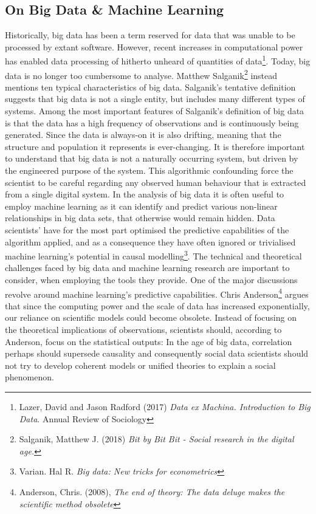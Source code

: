 \documentclass[12pt,a4paper]{article}
\begin{document}
\subsection{On Big Data \& Machine Learning}
Historically, big data has been a term reserved for data that was unable to be processed by extant software. However, recent increases in computational power has enabled data processing of hitherto unheard of quantities of data\footnote{Lazer, David and Jason Radford (2017) \textit{Data ex Machina. Introduction to Big Data}. Annual Review of Sociology}. Today, big data is no longer too cumbersome to analyse. Matthew Salganik\footnote{Salganik, Matthew J. (2018) \textit{Bit by Bit Bit - Social research in the digital age.}} instead mentions ten typical characteristics of big data. Salganik's tentative definition suggests that big data is not a single entity, but includes many different types of systems. Among the most important features of Salganik's definition of big data is that the data has a high frequency of observations and is continuously being generated. Since the data is always-on it is also drifting, meaning that the structure and population it represents is ever-changing. It is therefore important to understand that big data is not a naturally occurring system, but driven by the engineered purpose of the system. This algorithmic confounding force the scientist to be careful regarding any observed human behaviour that is extracted from a single digital system.\newline
In the analysis of big data it is often useful to employ machine learning as it can identify and predict various non-linear relationships in big data sets, that otherwise would remain hidden. Data scientists' have for the most part optimised the predictive capabilities of the algorithm applied, and as a consequence they have often ignored or trivialised machine learning's potential in causal modelling\footnote{Varian. Hal R. \textit{Big data: New tricks for econometrics}}.\newline
The technical and theoretical challenges faced by big data and machine learning research are important to consider, when employing the tools they provide. One of the major discussions revolve around machine learning's predictive capabilities. Chris Anderson\footnote{Anderson, Chris. (2008), \textit{The end of theory: The data deluge makes the scientific method obsolete}} argues that since the computing power and the scale of data has increased exponentially, our reliance on scientific models could become obsolete. Instead of focusing on the theoretical implications of observations, scientists should, according to Anderson, focus on the statistical outputs: In the age of big data, correlation perhaps should supersede causality and consequently social data scientists should not try to develop coherent models or unified theories to explain a social phenomenon.\newline
\end{document}

